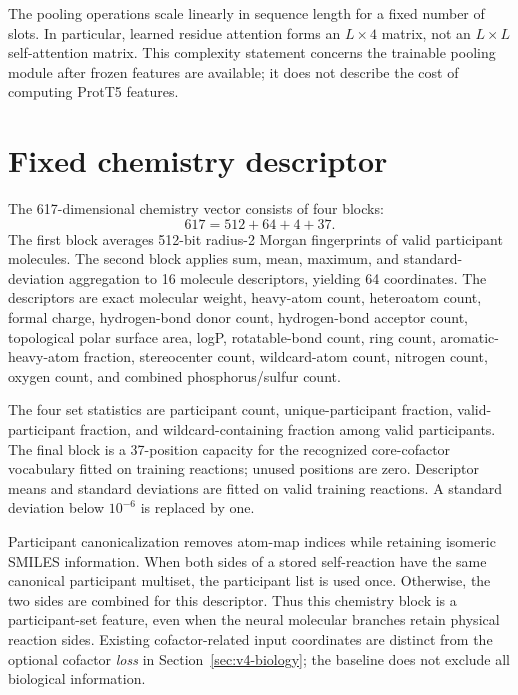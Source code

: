 The pooling operations scale linearly in sequence length for a fixed number
of slots. In particular, learned residue attention forms an $L\times4$
matrix, not an $L\times L$ self-attention matrix. This complexity statement
concerns the trainable pooling module after frozen features are available;
it does not describe the cost of computing ProtT5 features.

\section{Fixed chemistry descriptor}
\label{app:v4-chemistry}
The 617-dimensional chemistry vector consists of four blocks:
\begin{equation}
  617=512+64+4+37.
\end{equation}
The first block averages 512-bit radius-2 Morgan fingerprints of valid
participant molecules. The second block applies sum, mean, maximum, and
standard-deviation aggregation to 16 molecule descriptors, yielding 64
coordinates. The descriptors are exact molecular weight, heavy-atom count,
heteroatom count, formal charge, hydrogen-bond donor count, hydrogen-bond
acceptor count, topological polar surface area, logP, rotatable-bond count,
ring count, aromatic-heavy-atom fraction, stereocenter count, wildcard-atom
count, nitrogen count, oxygen count, and combined phosphorus/sulfur count.

The four set statistics are participant count, unique-participant fraction,
valid-participant fraction, and wildcard-containing fraction among valid
participants. The final block is a 37-position capacity for the recognized
core-cofactor vocabulary fitted on training reactions; unused positions are
zero. Descriptor means and standard deviations are fitted on valid training
reactions. A standard deviation below $10^{-6}$ is replaced by one.

Participant canonicalization removes atom-map indices while retaining
isomeric SMILES information. When both sides of a stored self-reaction have
the same canonical participant multiset, the participant list is used once.
Otherwise, the two sides are combined for this descriptor. Thus this chemistry
block is a participant-set feature, even when the neural molecular branches
retain physical reaction sides. Existing cofactor-related input coordinates
are distinct from the optional cofactor \emph{loss} in
Section~\ref{sec:v4-biology}; the baseline does not exclude all biological
information.


